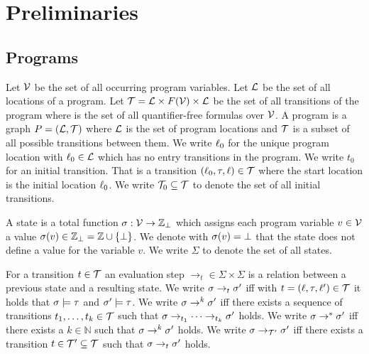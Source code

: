 \section{Preliminaries}


\subsection{Programs}

\begin{definition}[Program] 
  Let $\mathcal{V}$ be the set of all occurring program variables.
  Let $\mathcal{L}$ be the set of all locations of a program.
  Let $\mathcal{T} = \mathcal{L} \times F(\mathcal{V}) \times \mathcal{L}$ be the set of all transitions of the program where  is the set of all quantifier-free formulas over $\mathcal{V}$.
  A program is a graph $P = (\mathcal{L}, \mathcal{T})$ where $\mathcal{L}$ is the set of program locations and $\mathcal{T}$ is a subset of all possible transitions between them.
  We write $\ell_0$ for the unique program location with $\ell_0 \in \mathcal{L}$ which has no entry transitions in the program.
  We write $t_0$ for an initial transition. That is a transition $(\ell_0, \tau, \ell) \in \mathcal{T}$ where the start location is the initial location $\ell_0$.
  We write $\mathcal{T}_0 \subseteq \mathcal{T}$ to denote the set of all initial transitions.
\end{definition}

\begin{definition}[State] 
  A state is a total function $\sigma: \mathcal{V} \rightarrow \mathbb{Z}_\bot$ which assigns each program variable $v \in \mathcal{V}$ a value $\sigma(v) \in \mathbb{Z}_\bot = \mathbb{Z} \cup \lbrace \bot \rbrace$.
  We denote with $\sigma(v) = \bot$ that the state does not define a value for the variable $v$.
  We write $\Sigma$ to denote the set of all states.
\end{definition}

\begin{definition}[Evaluation] 
  For a transition $t \in \mathcal{T}$ an evaluation step $\rightarrow_t \in \Sigma \times \Sigma$ is a relation between a previous state and a resulting state.
  We write $\sigma \rightarrow_t \sigma'$ iff with $t = (\ell, \tau, \ell') \in \mathcal{T}$ it holds that $\sigma \models \tau$ and $\sigma' \models \tau$.
  We write $\sigma \rightarrow^k \sigma'$ iff there exists a sequence of transitions $t_1, \dots, t_k \in \mathcal{T}$ such that $\sigma \rightarrow_{t_1} \dots \rightarrow_{t_k} \sigma'$ holds.
  We write $\sigma \rightarrow^* \sigma'$ iff there exists a $k \in \mathbb{N}$ such that $\sigma \rightarrow^k \sigma'$ holds.
  We write $\sigma \rightarrow_{\mathcal{T}'} \sigma'$ iff there exists a transition $t \in \mathcal{T}' \subseteq \mathcal{T}$ such that $\sigma \rightarrow_t \sigma'$ holds.
\end{definition}


